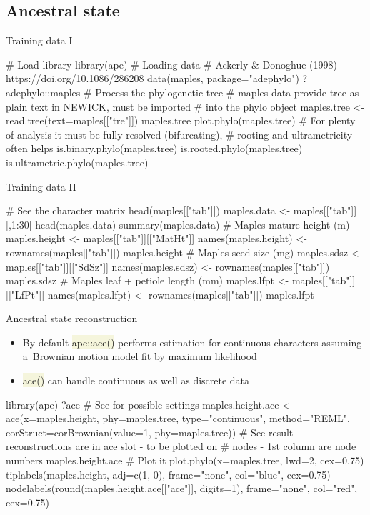 \documentclass[compress, xelatex, 11pt, xcolor=svgnames, aspectratio=169,
	hyperref={
		bookmarks=true,
		unicode=true,
		colorlinks=true,
		pdftitle={Molecular data in R},
		plainpages=false,
		pdfauthor={Vojtech Zeisek},
		pdfsubject={Course about phylogeny and evolution in R},
		pdfcreator={XeLaTeX},
		pdfkeywords={R, evolution, phylogeny, molecular data},
		linkcolor=Crimson, %
		anchorcolor=Magenta, %
		citecolor=Magenta, %
		filecolor=Magenta, %
		menucolor=Magenta, %
		urlcolor=DodgerBlue, %
		},
	url={hyphens, lowtilde} %
	]{beamer}
\renewcommand{\texttt}[1]{\colorbox{Beige}{{\ttfamily #1}}}
\begin{document}
\subsection{Ancestral state}

\begin{frame}[fragile]{Training data I}
	\begin{spluscode}
    # Load library
    library(ape)
    # Loading data
    # Ackerly & Donoghue (1998) https://doi.org/10.1086/286208
    data(maples, package="adephylo")
    ?adephylo::maples
    # Process the phylogenetic tree
    # maples data provide tree as plain text in NEWICK, must be imported
    # into the phylo object
    maples.tree <- read.tree(text=maples[["tre"]])
    maples.tree
    plot.phylo(maples.tree)
    # For plenty of analysis it must be fully resolved (bifurcating),
    # rooting and ultrametricity often helps
    is.binary.phylo(maples.tree)
    is.rooted.phylo(maples.tree)
    is.ultrametric.phylo(maples.tree)
	\end{spluscode}
\end{frame}

\begin{frame}[fragile]{Training data II}
	\begin{spluscode}
    # See the character matrix
    head(maples[["tab"]])
    maples.data <- maples[["tab"]][,1:30]
    head(maples.data)
    summary(maples.data)
    # Maples mature height (m)
    maples.height <- maples[["tab"]][["MatHt"]]
    names(maples.height) <- rownames(maples[["tab"]])
    maples.height
    # Maples seed size (mg)
    maples.sdsz  <- maples[["tab"]][["SdSz"]]
    names(maples.sdsz) <- rownames(maples[["tab"]])
    maples.sdsz
    # Maples leaf + petiole length (mm)
    maples.lfpt <- maples[["tab"]][["LfPt"]]
    names(maples.lfpt) <- rownames(maples[["tab"]])
    maples.lfpt
	\end{spluscode}
\end{frame}

\begin{frame}[fragile]{Ancestral state reconstruction}
	\begin{itemize}
		\item By default \texttt{ape::ace()} performs estimation for continuous characters assuming a~Brownian motion model fit by maximum likelihood
		\item \texttt{ace()} can handle continuous as well as discrete data
	\end{itemize}
	\begin{spluscode}
    library(ape)
    ?ace # See for possible settings
    maples.height.ace <- ace(x=maples.height, phy=maples.tree,
      type="continuous", method="REML", corStruct=corBrownian(value=1,
      phy=maples.tree))
    # See result - reconstructions are in ace slot - to be plotted on
    # nodes - 1st column are node numbers
    maples.height.ace
    # Plot it
    plot.phylo(x=maples.tree, lwd=2, cex=0.75)
    tiplabels(maples.height, adj=c(1, 0), frame="none", col="blue", cex=0.75)
    nodelabels(round(maples.height.ace[["ace"]], digits=1), frame="none",
      col="red", cex=0.75)
	\end{spluscode}
\end{frame}
\end{document}

